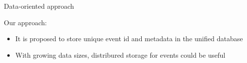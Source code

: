 \documentclass[18pt]{beamer}
\begin{document}
\begin{frame}{Data-oriented approach}



Our approach:
\begin{itemize}
 \item It is proposed to store unique event id and metadata in the unified database
 \item With growing data sizes, distribured storage for events could be useful
\end{itemize}
\end{frame}
\end{document}
